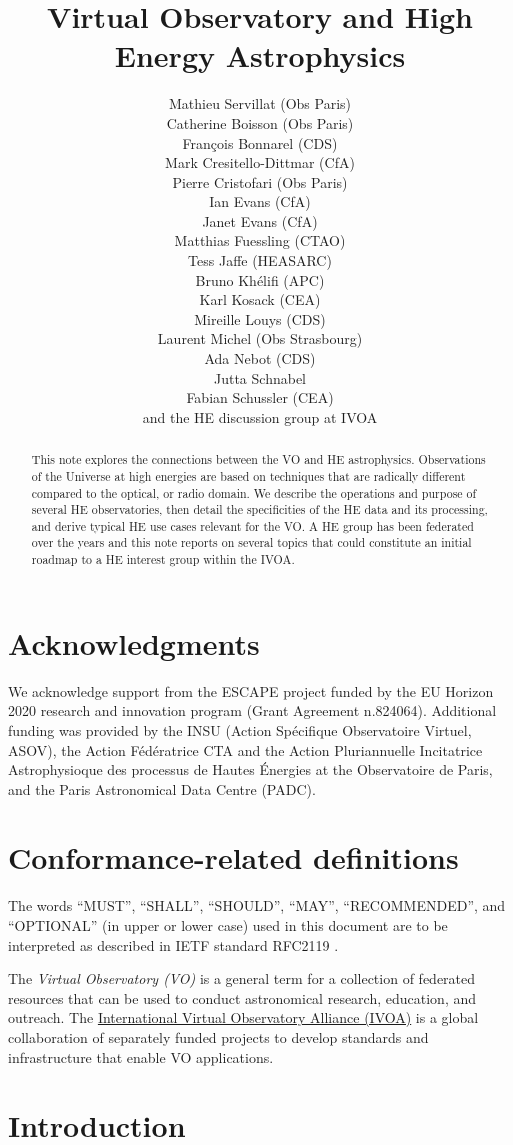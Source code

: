 \documentclass[11pt,a4paper]{ivoa}
\title{Virtual Observatory and High Energy Astrophysics}
\author{
Mathieu Servillat (Obs Paris)\\
Catherine Boisson (Obs Paris)\\
François Bonnarel (CDS)\\
Mark Cresitello-Dittmar (CfA)\\
Pierre Cristofari (Obs Paris)\\
Ian Evans (CfA)\\
Janet Evans (CfA)\\
Matthias Fuessling (CTAO)\\
Tess Jaffe (HEASARC)\\
Bruno Khélifi (APC)\\
Karl Kosack (CEA)\\
Mireille Louys (CDS)\\
Laurent Michel (Obs Strasbourg)\\
Ada Nebot (CDS)\\
Jutta Schnabel\\
Fabian Schussler (CEA)\\
and the HE discussion group at IVOA
}
\begin{document}
\begin{abstract}
This note explores the connections between the \gls{VO} and \gls{HE} astrophysics. Observations of the Universe at high energies are based on techniques that are radically different compared to the optical, or radio domain. We describe the operations and purpose of several HE observatories, then detail the specificities of the \gls{HE} data and its processing, and derive typical \gls{HE} use cases relevant for the \gls{VO}. A \gls{HE} group has been federated over the years and this note reports on several topics that could constitute an initial roadmap to a \gls{HE} interest group within the \gls{IVOA}.
\end{abstract}


\section*{Acknowledgments}

We acknowledge support from the ESCAPE project funded by the EU Horizon 2020 research and innovation program (Grant Agreement n.824064).
Additional funding was provided by the INSU (Action Sp\'ecifique Observatoire Virtuel, ASOV), the Action F\'ed\'eratrice
CTA and the Action Pluriannuelle Incitatrice Astrophysioque des processus de Hautes \'Energies at the Observatoire de
Paris, and the Paris Astronomical Data Centre (PADC).

\section*{Conformance-related definitions}

The words ``MUST'', ``SHALL'', ``SHOULD'', ``MAY'', ``RECOMMENDED'', and
``OPTIONAL'' (in upper or lower case) used in this document are to be
interpreted as described in IETF standard RFC2119 \citep{std:RFC2119}.

The \emph{Virtual Observatory (VO)} is a
general term for a collection of federated resources that can be used
to conduct astronomical research, education, and outreach.
The \href{https://www.ivoa.net}{International Virtual Observatory Alliance (IVOA)} is a global
collaboration of separately funded projects to develop standards and
infrastructure that enable VO applications.


\section{Introduction}
\end{document}
